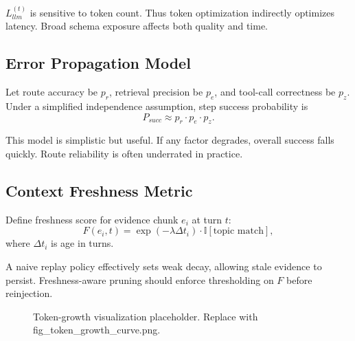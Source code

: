 \documentclass[conference]{IEEEtran}
\begin{document}
$L^{(t)}_{llm}$ is sensitive to token count.
Thus token optimization indirectly optimizes latency.
Broad schema exposure affects both quality and time.

\subsection{Error Propagation Model}

Let route accuracy be $p_r$,
retrieval precision be $p_e$,
and tool-call correctness be $p_z$.
Under a simplified independence assumption,
step success probability is
\begin{equation}
P_{succ} \approx p_r\cdot p_e\cdot p_z.
\end{equation}

This model is simplistic but useful.
If any factor degrades,
overall success falls quickly.
Route reliability is often underrated in practice.

\subsection{Context Freshness Metric}

Define freshness score for evidence chunk $e_i$ at turn $t$:
\begin{equation}
F(e_i,t)=\exp(-\lambda\Delta t_i)\cdot \mathbb{I}[\text{topic match}],
\end{equation}
where $\Delta t_i$ is age in turns.

A naive replay policy effectively sets weak decay,
allowing stale evidence to persist.
Freshness-aware pruning should enforce thresholding on $F$ before reinjection.

\begin{figure}[H]
\centering
{}
\caption{Token-growth visualization placeholder. Replace with fig\_token\_growth\_curve.png.}
\label{fig:token_growth}
\end{figure}

\end{document}
